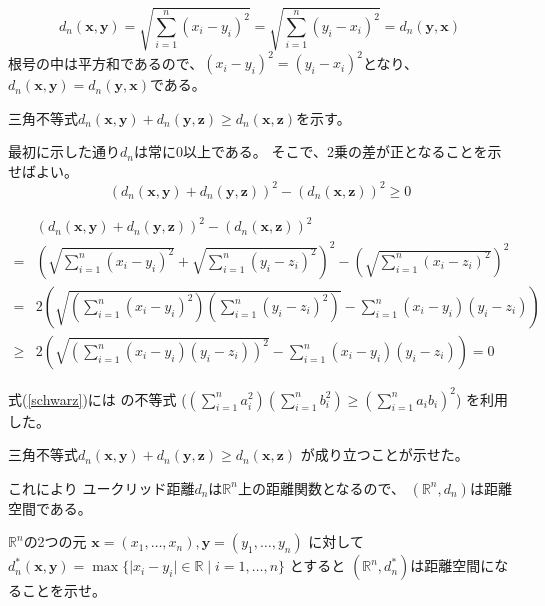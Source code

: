 \documentclass[12pt,b5paper]{ltjsarticle}
\begin{document}
\begin{equation}
 d_n(\bm{x},\bm{y}) = \sqrt{\sum_{i=1}^{n}(x_i - y_i)^2}
 = \sqrt{\sum_{i=1}^{n}(y_i - x_i)^2} = d_n(\bm{y},\bm{x})
\end{equation}
根号の中は平方和であるので、$(x_i-y_i)^2 = (y_i-x_i)^2$となり、
$d_n(\bm{x},\bm{y})=d_n(\bm{y},\bm{x})$である。



三角不等式$d_n(\bm{x},\bm{y})+d_n(\bm{y},\bm{z})\geq d_n(\bm{x},\bm{z})$を示す。

最初に示した通り$d_n$は常に0以上である。
そこで、2乗の差が正となることを示せばよい。
\begin{equation}
 ( d_n(\bm{x},\bm{y})+d_n(\bm{y},\bm{z}) )^2 - ( d_n(\bm{x},\bm{z}) )^2 \geq 0
\end{equation}


\begin{align}
 & ( d_n(\bm{x},\bm{y})+d_n(\bm{y},\bm{z}) )^2 - ( d_n(\bm{x},\bm{z}) )^2\\
 = & \left( \sqrt{\sum_{i=1}^{n}(x_i - y_i)^2} + \sqrt{\sum_{i=1}^{n}(y_i - z_i)^2} \right)^2 - \left( \sqrt{\sum_{i=1}^{n}(x_i - z_i)^2} \right)^2\\
 = & 2\left(\sqrt{ \left( \sum_{i=1}^{n}(x_i - y_i)^2 \right) \left(\sum_{i=1}^{n}(y_i - z_i)^2 \right) } - \sum_{i=1}^{n}(x_i - y_i)(y_i - z_i) \right) \label{schwarz}\\
 \geq & 2\left(\sqrt{ \left( \sum_{i=1}^{n}(x_i - y_i)(y_i - z_i) \right)^2 } - \sum_{i=1}^{n}(x_i - y_i)(y_i - z_i) \right) =0
\end{align}

式(\ref{schwarz})には
の不等式
($
(\sum_{i=1}^{n}a_i^2)
(\sum_{i=1}^{n}b_i^2)
\geq
\left( \sum_{i=1}^{n}a_ib_i \right)^2
$)
を利用した。


三角不等式$d_n(\bm{x},\bm{y})+d_n(\bm{y},\bm{z})\geq d_n(\bm{x},\bm{z})$
が成り立つことが示せた。

これにより
ユークリッド距離$d_n$は$\mathbb{R}^n$上の距離関数となるので、
$(\mathbb{R}^n,d_n)$は距離空間である。



\hrulefill

$\mathbb{R}^n$の2つの元
$\bm{x}=(x_1,\dots,x_n),\bm{y}=(y_1,\dots,y_n)$
に対して
$d_n^{*}(\bm{x},\bm{y})=\max\{ \lvert x_i-y_i \lvert \in \mathbb{R} \mid i=1,\dots,n \}$
とすると
$(\mathbb{R}^n,d_n^{*})$は距離空間になることを示せ。
\end{document}
